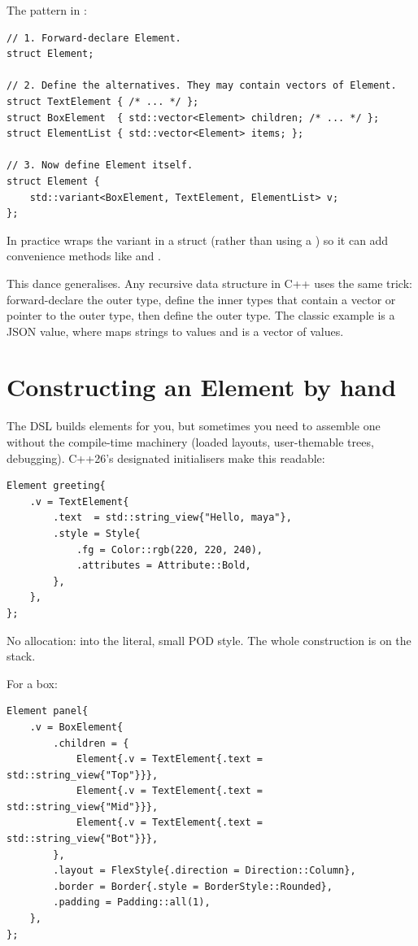 The pattern in \maya{}:

\begin{lstlisting}
// 1. Forward-declare Element.
struct Element;

// 2. Define the alternatives. They may contain vectors of Element.
struct TextElement { /* ... */ };
struct BoxElement  { std::vector<Element> children; /* ... */ };
struct ElementList { std::vector<Element> items; };

// 3. Now define Element itself.
struct Element {
    std::variant<BoxElement, TextElement, ElementList> v;
};
\end{lstlisting}

In practice \maya{} wraps the variant in a struct (rather than
using a ) so it can
add convenience methods like  and
.

\begin{aside}
This dance generalises. Any recursive data structure in C++ uses
the same trick: forward-declare the outer type, define the inner
types that contain a vector or pointer to the outer type, then
define the outer type. The classic example is a JSON value, where
 maps strings to values and  is a vector
of values.
\end{aside}

\section{Constructing an Element by hand}

The DSL builds elements for you, but sometimes you need to
assemble one without the compile-time machinery (loaded layouts,
user-themable trees, debugging). C++26's designated initialisers
make this readable:

\begin{lstlisting}
Element greeting{
    .v = TextElement{
        .text  = std::string_view{"Hello, maya"},
        .style = Style{
            .fg = Color::rgb(220, 220, 240),
            .attributes = Attribute::Bold,
        },
    },
};
\end{lstlisting}

No allocation:  into the literal, small POD
style. The whole construction is on the stack.

For a box:

\begin{lstlisting}
Element panel{
    .v = BoxElement{
        .children = {
            Element{.v = TextElement{.text = std::string_view{"Top"}}},
            Element{.v = TextElement{.text = std::string_view{"Mid"}}},
            Element{.v = TextElement{.text = std::string_view{"Bot"}}},
        },
        .layout = FlexStyle{.direction = Direction::Column},
        .border = Border{.style = BorderStyle::Rounded},
        .padding = Padding::all(1),
    },
};
\end{lstlisting}

